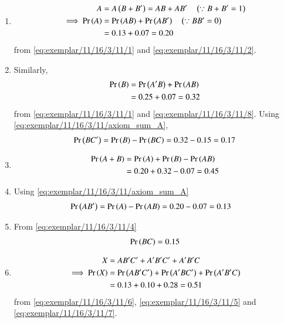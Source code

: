 \documentclass[journal,12pt,twocolumn]{IEEEtran}
\begin{document}
\begin{enumerate}
\item 
\begin{align}
A &= A \left(B+B^{\prime}\right) =  AB + AB^{\prime}\quad
	\left(\because B + B^\prime = 1\right)\\\label{eq:exemplar/11/16/3/11/axiom_sum_A}
\implies \Pr\left(A\right) &= \Pr\left(AB\right) +\Pr\left(AB^\prime\right)
	\quad \left(\because BB^\prime = 0\right) \\
 &= 0.13 + 0.07
       = 0.20
\end{align}
from \eqref{eq:exemplar/11/16/3/11/1} and \eqref{eq:exemplar/11/16/3/11/2}.
\item Similarly,
\begin{align}
    \Pr\left(B\right) &= \Pr\left(A^\prime B\right) + \Pr\left(AB\right)\\
    \label{eq:exemplar/11/16/3/11/3}
 &= 0.25 + 0.07
       = 0.32
\end{align}
from \eqref{eq:exemplar/11/16/3/11/1} and \eqref{eq:exemplar/11/16/3/11/8}.
Using \eqref{eq:exemplar/11/16/3/11/axiom_sum_A},
\begin{align}
    \Pr\left(BC^\prime\right) = \Pr\left(B\right) - \Pr\left(BC\right) 
    = 0.32 - 0.15
    = 0.17
\end{align}
\item 
\begin{align}
\label{Axioms}
    \Pr\left(A + B\right) &= \Pr\left(A\right) + \Pr\left(B\right) - \Pr\left(AB\right)\\
    &= 0.20 + 0.32 - 0.07
    = 0.45
\end{align}
\item 
Using \eqref{eq:exemplar/11/16/3/11/axiom_sum_A}
\begin{align}
    \Pr\left(AB^\prime\right) &= \Pr\left(A\right) - \Pr\left(AB\right) 
    = 0.20 - 0.07
    = 0.13
\end{align}
\item 
From \eqref{eq:exemplar/11/16/3/11/4}
\begin{align}
    \Pr\left(BC\right) = 0.15
\end{align}
\item 
\begin{align}
    X&=AB^\prime C^\prime+A^\prime B^\prime C^\prime+A^\prime B^\prime C
	\\
    \implies 
    \Pr\left(X\right)&=\Pr\left(AB^\prime C^\prime\right)+\Pr\left(A^\prime BC^\prime\right)+\Pr\left(A^\prime B^\prime C\right)
    \\
&=0.13+0.10+0.28
    =0.51
\end{align}
from \eqref{eq:exemplar/11/16/3/11/6}, \eqref{eq:exemplar/11/16/3/11/5} and \eqref{eq:exemplar/11/16/3/11/7}.
\end{enumerate}
\end{document}
